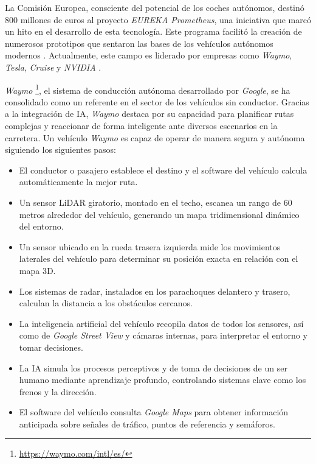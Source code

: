 La Comisión Europea, consciente del potencial de los coches autónomos, destinó 800 millones de euros al proyecto  \textit{EUREKA Prometheus}, una iniciativa que marcó un hito en el desarrollo de esta tecnología. Este programa facilitó la creación de numerosos prototipos que sentaron las bases de los vehículos autónomos modernos  \cite{history-vehicles}. Actualmente, este campo es liderado por empresas como  \textit{Waymo},  \textit{Tesla},  \textit{Cruise} y  \textit{NVIDIA } \cite{ai-self-driving-cars}.

\textit{Waymo} \footnote{\url{https://waymo.com/intl/es/}}, el sistema de conducción autónoma desarrollado por \textit{Google}, se ha consolidado como un referente en el sector de los vehículos sin conductor. Gracias a la integración de \ac{IA}, \textit{Waymo} destaca por su capacidad para planificar rutas complejas y reaccionar de forma inteligente ante diversos escenarios en la carretera. Un vehículo \textit{Waymo} es capaz de operar de manera segura y autónoma siguiendo los siguientes pasos:

\begin{itemize}
    \item El conductor o pasajero establece el destino y el software del vehículo calcula automáticamente la mejor ruta.
    \item Un sensor \ac{LiDAR} giratorio, montado en el techo, escanea un rango de 60 metros alrededor del vehículo, generando un mapa tridimensional dinámico del entorno.
    \item Un sensor ubicado en la rueda trasera izquierda mide los movimientos laterales del vehículo para determinar su posición exacta en relación con el mapa 3D.
    \item Los sistemas de radar, instalados en los parachoques delantero y trasero, calculan la distancia a los obstáculos cercanos.
    \item La inteligencia artificial del vehículo recopila datos de todos los sensores, así como de \textit{Google Street View} y cámaras internas, para interpretar el entorno y tomar decisiones.
    \item La \ac{IA} simula los procesos perceptivos y de toma de decisiones de un ser humano mediante aprendizaje profundo, controlando sistemas clave como los frenos y la dirección.
    \item El software del vehículo consulta \textit{Google Maps} para obtener información anticipada sobre señales de tráfico, puntos de referencia y semáforos.
\end{itemize}

